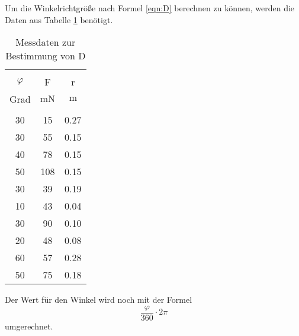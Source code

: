 Um die Winkelrichtgröße nach Formel \eqref{eqn:D} berechnen zu können, werden
die Daten aus Tabelle \ref{MessD} benötigt.
\begin{table}[H]
  \begin{tabular}{c c c}
    \toprule \\
    $\varphi$ & F & r \\
    Grad & $\si{\milli\newton}$ & $\si{\meter}$ \\
    \midrule \\
    30  &    15   &   0.27  \\
    30  &    55   &   0.15  \\
    40  &    78   &   0.15  \\
    50  &   108   &   0.15  \\
    30  &    39   &   0.19  \\
    10  &    43   &   0.04  \\
    30  &    90   &   0.10  \\
    20  &    48   &   0.08  \\
    60  &    57   &   0.28  \\
    50  &    75   &   0.18  \\
    \bottomrule
  \end{tabular}
  \caption{Messdaten zur Bestimmung von D}
  \label{MessD}
\end{table}
Der Wert für den Winkel wird noch mit der Formel
\begin{equation*}
  \frac{\varphi}{360}\cdot2\pi
\end{equation*}
umgerechnet. 
